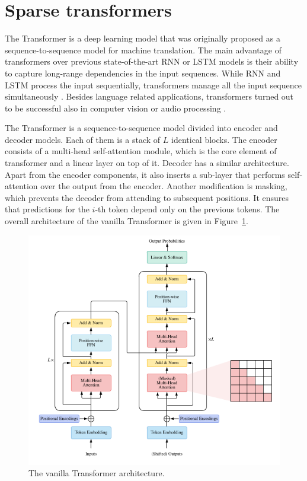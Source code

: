 \documentclass[magisterska,en]{pracamgr}
\begin{document}
\section{Sparse transformers}
The Transformer \cite{DBLP:conf/nips/VaswaniSPUJGKP17} is a deep learning model that was originally proposed as a sequence-to-sequence model \cite{DBLP:conf/nips/SutskeverVL14} for machine translation. The main advantage of transformers over previous state-of-the-art RNN or LSTM models is their ability to capture long-range dependencies in the input sequences. While RNN and LSTM process the input sequentially, transformers manage all the input sequence simultaneously \cite{DBLP:journals/corr/abs-2306-07303}.
Besides language related applications, transformers turned out to be successful also in computer vision \cite{DBLP:conf/iclr/DosovitskiyB0WZ21} or audio processing \cite{DBLP:journals/corr/abs-2106-04554}.

The Transformer is a sequence-to-sequence model divided into encoder and decoder models. Each of them is a stack of $L$ identical blocks. The encoder consists of a multi-head self-attention module, which is the core element of transformer and a linear layer on top of it. Decoder has a similar architecture. Apart from the encoder components, it also inserts a sub-layer that performs self-attention over the output from the encoder. Another modification is masking, which prevents the decoder from attending to subsequent positions. It ensures that predictions for the $i$-th token depend only on the previous tokens. The overall architecture of the vanilla Transformer is given in Figure~\ref{attention}.

\begin{figure}[H]
\centering
\includegraphics[scale=0.5]{images/attention.png}
\caption{The vanilla Transformer architecture.}
\label{attention}
\end{figure}
\end{document}
